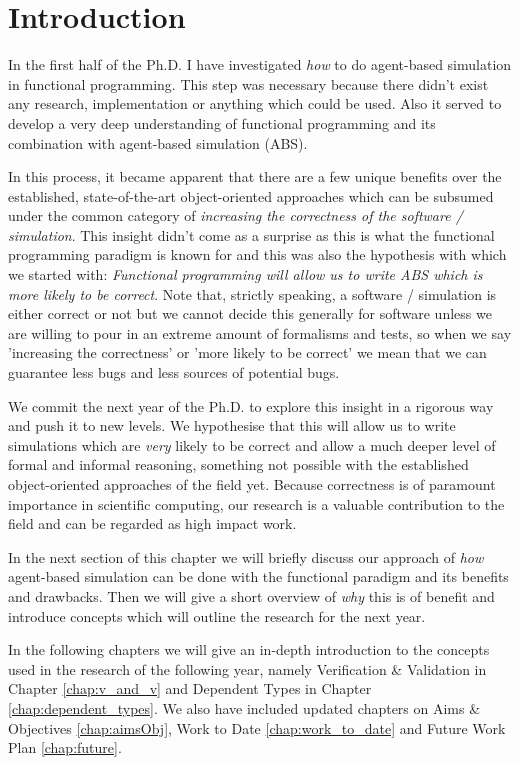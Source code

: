 \chapter{Introduction}
\label{chap:intro}
In the first half of the Ph.D. I have investigated \textit{how} to do agent-based simulation in functional programming. This step was necessary because there didn't exist any research, implementation or anything which could be used. Also it served to develop a very deep understanding of functional programming and its combination with agent-based simulation (ABS).

In this process, it became apparent that there are a few unique benefits over the established, state-of-the-art object-oriented approaches which can be subsumed under the common category of \textit{increasing the correctness of the software / simulation}. This insight didn't come as a surprise as this is what the functional programming paradigm is known for and this was also the hypothesis with which we started with: \textit{Functional programming will allow us to write ABS which is more likely to be correct}. Note that, strictly speaking, a software / simulation is either correct or not but we cannot decide this generally for software unless we are willing to pour in an extreme amount of formalisms and tests, so when we say 'increasing the correctness' or 'more likely to be correct' we mean that we can guarantee less bugs and less sources of potential bugs.

We commit the next year of the Ph.D. to explore this insight in a rigorous way and push it to new levels. We hypothesise that this will allow us to write simulations which are \textit{very} likely to be correct and allow a much deeper level of formal and informal reasoning, something not possible with the established object-oriented approaches of the field yet. Because correctness is of paramount importance in scientific computing, our research is a valuable contribution to the field and can be regarded as high impact work.

In the next section of this chapter we will briefly discuss our approach of \textit{how} agent-based simulation can be done with the functional paradigm and its benefits and drawbacks. Then we will give a short overview of \textit{why} this is of benefit and introduce concepts which will outline the research for the next year.

In the following chapters we will give an in-depth introduction to the concepts used in the research of the following year, namely Verification \& Validation in Chapter \ref{chap:v_and_v} and Dependent Types in Chapter \ref{chap:dependent_types}.
We also have included updated chapters on Aims \& Objectives \ref{chap:aimsObj}, Work to Date \ref{chap:work_to_date} and Future Work Plan \ref{chap:future}.

